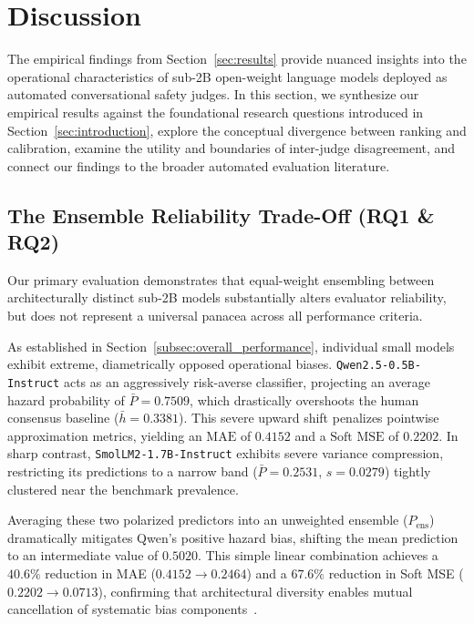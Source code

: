 \section{Discussion}
\label{sec:discussion}

The empirical findings from Section~\ref{sec:results} provide nuanced insights into the operational characteristics of sub-2B open-weight language models deployed as automated conversational safety judges. In this section, we synthesize our empirical results against the foundational research questions introduced in Section~\ref{sec:introduction}, explore the conceptual divergence between ranking and calibration, examine the utility and boundaries of inter-judge disagreement, and connect our findings to the broader automated evaluation literature.

\subsection{The Ensemble Reliability Trade-Off (RQ1 \& RQ2)}
\label{subsec:disc_ensemble_tradeoff}

Our primary evaluation demonstrates that equal-weight ensembling between architecturally distinct sub-2B models substantially alters evaluator reliability, but does not represent a universal panacea across all performance criteria.

As established in Section~\ref{subsec:overall_performance}, individual small models exhibit extreme, diametrically opposed operational biases. \texttt{Qwen2.5-0.5B-Instruct} acts as an aggressively risk-averse classifier, projecting an average hazard probability of $\bar{P}=0.7509$, which drastically overshoots the human consensus baseline ($\bar{h}=0.3381$). This severe upward shift penalizes pointwise approximation metrics, yielding an $\text{MAE}$ of $0.4152$ and a $\text{Soft MSE}$ of $0.2202$. In sharp contrast, \texttt{SmolLM2-1.7B-Instruct} exhibits severe variance compression, restricting its predictions to a narrow band ($\bar{P}=0.2531$, $s=0.0279$) tightly clustered near the benchmark prevalence.

Averaging these two polarized predictors into an unweighted ensemble ($P_{\text{ens}}$) dramatically mitigates Qwen's positive hazard bias, shifting the mean prediction to an intermediate value of $0.5020$. This simple linear combination achieves a $40.6\%$ reduction in MAE ($0.4152 \to 0.2464$) and a $67.6\%$ reduction in Soft MSE ($0.2202 \to 0.0713$), confirming that architectural diversity enables mutual cancellation of systematic bias components~\cite{lakshminarayanan2017simple,ovadia2019can}.

